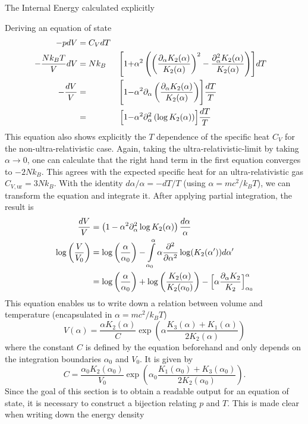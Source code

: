 \begin{section}{The Internal Energy calculated explicitly}
\begin{subsection}{Deriving an equation of state}
\begin{alignat}{3}
    -pdV &= C_VdT\\
    -\frac{Nk_BT}{V}dV &= Nk_B &\Biggl[1 + &\alpha^2\left(\left(\frac{\partial_\alpha K_2(\alpha)}{K_2(\alpha)}\right)^2 - \frac{\partial^2_\alpha K_2(\alpha)}{K_2(\alpha)}\right)\Biggr]dT\\
    - \frac{dV}{V} &= &\Biggl[1 - &\alpha^2\partial_\alpha\left(\frac{\partial_\alpha K_2(\alpha)}{K_2(\alpha)}\right)\Biggr]\frac{dT}{T}\\
    &= &\Bigl[1 - &\alpha^2\partial_\alpha^2\left(\log K_2(\alpha)\right)\Bigr]\frac{dT}{T}
\end{alignat}
This equation also shows explicitly the $T$ dependence of the specific heat $C_V$ for the non-ultra-relativistic case. Again, taking the ultra-relativistic-limit by taking $\alpha\rightarrow0$, one can calculate that the right hand term in the first equation converges to $-2Nk_B$. This agrees with the expected specific heat for an ultra-relativistic gas $C_{V,\text{ur}}=3Nk_B$. With the identity $d\alpha/\alpha = -dT/T$ (using $\alpha=mc^2/k_BT$), we can transform the equation and integrate it. After applying partial integration, the result is
\begin{align}
	\frac{dV}{V} &= \left(1-\alpha^2\partial_\alpha^2\log K_2(\alpha)\right)\frac{d\alpha}{\alpha}\\
    \log\left(\frac{V}{V_0}\right) &= \log\left(\frac{\alpha}{\alpha_0}\right) - \int\limits_{\alpha_0}^\alpha \alpha\frac{\partial^2}{\partial \alpha^2}\log(K_2(\alpha'))d\alpha'\\
    &=\log\left(\frac{\alpha}{\alpha_0}\right) + \log\left(\frac{K_2(\alpha)}{K_2(\alpha_0)}\right) - \Bigl[\alpha\frac{\partial_\alpha K_2}{K_2}\Bigr]_{\alpha_0}^\alpha
\end{align}
This equation enables us to write down a relation between volume and temperature (encapsulated in $\alpha=mc^2/k_BT$)
\begin{equation}
	V(\alpha) = \frac{\alpha K_2(\alpha)}{C}\exp\left(\alpha\frac{K_3(\alpha)+K_1(\alpha)}{2K_2(\alpha)}\right)
\end{equation}
where the constant $C$ is defined by the equation beforehand and only depends on the integration boundaries $\alpha_0$ and $V_0$. It is given by
\begin{equation}
	C = \frac{\alpha_0 K_2(\alpha_0)}{V_0}\exp\left(\alpha_0\frac{K_1(\alpha_0)+K_3(\alpha_0)}{2K_2(\alpha_0)}\right).
\end{equation}
Since the goal of this section is to obtain a readable output for an equation of state, it is necessary to construct a bijection relating $p$ and $T$. This is made clear when writing down the energy density

\end{subsection}
\end{section}
